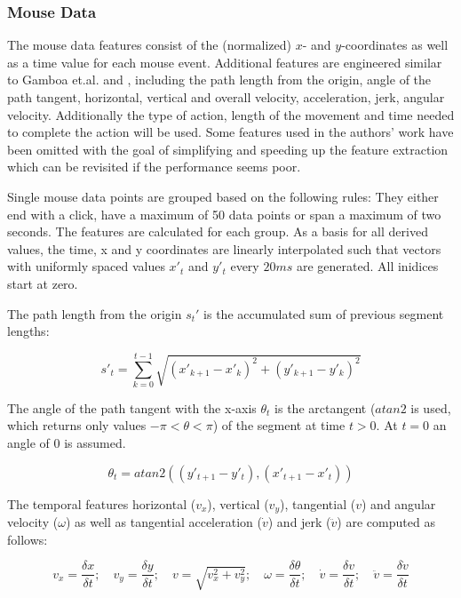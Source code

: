 \documentclass[
    fontsize=12pt,
    headings=small,
    parskip=half,           %
    bibliography=totoc,
    numbers=noenddot,       %
    open=any,               %
    final,                   %
    table
]{scrreprt}
\begin{document}
\label{concept_mouse_data}
\subsubsection{Mouse Data}

The mouse data features consist of the (normalized) $x$- and $y$-coordinates as well as a time value for each mouse event. Additional features are engineered similar to Gamboa et.al.\cite{GAMBOA2004} and \cite{https://doi.org/10.1049/iet-bmt.2018.5126}, including the path length from the origin, angle of the path tangent, horizontal, vertical and overall velocity, acceleration, jerk, angular velocity. Additionally the type of action, length of the movement and time needed to complete the action will be used. Some features used in the authors' work have been omitted with the goal of simplifying and speeding up the feature extraction which can be revisited if the performance seems poor.

Single mouse data points are grouped based on the following rules: They either end with a click, have a maximum of 50 data points or span a maximum of two seconds. The features are calculated for each group. As a basis for all derived values, the time, x and y coordinates are linearly interpolated such that vectors with uniformly spaced values $x'_t$ and $y'_t$ every $20ms$ are generated. All inidices start at zero.

The path length from the origin $s_t'$ is the accumulated sum of previous segment lengths:

\[
s'_t = \sum_{k = 0}^{t - 1} \sqrt{(x'_{k+1} - x'_{k})^2 + (y'_{k+1} - y'_{k})^2}
\]

The angle of the path tangent with the x-axis $\theta_t$ is the arctangent ($atan2$ is used, which returns only values $-\pi < \theta < \pi$) of the segment at time $t > 0$. At $t=0$ an angle of $0$ is assumed.

\[
\theta_t = atan2( (y'_{t+1} - y'_{t}), (x'_{t+1} - x'_{t}) )
\]

The temporal features horizontal ($v_x$), vertical ($v_y$), tangential ($v$) and angular velocity ($\omega$) as well as tangential acceleration ($\dot{v}$) and jerk ($\ddot{v}$) are computed as follows:

\[
v_x = \frac{\delta x}{\delta t}; \quad
v_y = \frac{\delta y}{\delta t}; \quad
v = \sqrt{v_x^2 + v_y^2}; \quad
\omega = \frac{\delta \theta}{\delta t}; \quad
\dot{v} = \frac{\delta v}{\delta t}; \quad
\ddot{v} = \frac{\delta \dot{v}}{\delta t}
\]
\end{document}
